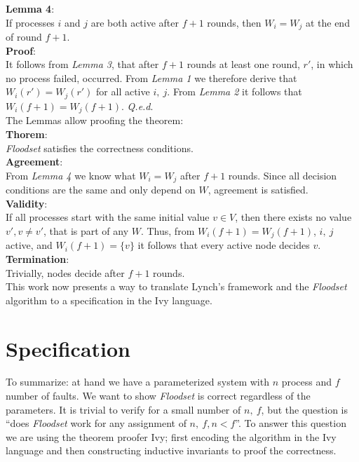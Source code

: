 \documentclass[fleqn]{article}
\begin{document}
\noindent \textbf{Lemma 4}:\\
If processes $i$ and $j$ are both active after $f+1$ rounds, then $W_i = W_j$ at the end of round $f + 1$.\\
\textbf{Proof}:\\
It follows from \textit{Lemma 3}, that after $f+1$ rounds at least one round, $r'$, in which no process failed, occurred. From \textit{Lemma 1} we therefore derive that $W_i(r') = W_j(r')$ for all active $i,\ j$.
From \textit{Lemma 2} it follows that $W_i(f+1) = W_j(f+1)$. \textit{Q.e.d}.\\

\noindent The Lemmas allow proofing the theorem:\\
\noindent \textbf{Thorem}:\\
\textit{Floodset} satisfies the correctness conditions.\\
\textbf{Agreement}:\\
From \textit{Lemma 4} we know what $W_i = W_j$ after $f+1$ rounds. Since all decision conditions are the same and only depend on $W$, agreement is satisfied.\\
\textbf{Validity}:\\
If all processes start with the same initial value $v \in V$, then there exists no value $v', v \neq v'$, that is part of any $W$. Thus, from $W_i(f+1) = W_j(f+1)$, $i,\ j$ active, and $W_i(f+1) = \{v\}$ it follows
that every active node decides $v$.\\
\textbf{Termination}:\\
Trivially, nodes decide after $f+1$ rounds.\\

This work now presents a way to translate Lynch's framework and the \textit{Floodset} algorithm to a specification in the Ivy language.

\section{Specification}
To summarize: at hand we have a parameterized system with $n$ process and $f$ number of faults. We want to show \textit{Floodset} is correct regardless of the parameters. It is trivial to verify for a small number of $n,\ f$, but the question is ``does \textit{Floodset} work for any assignment of $n,\ f, n \lt f$''.
To answer this question we are using the theorem proofer Ivy; first encoding the algorithm in the Ivy language and then constructing inductive invariants to proof the correctness.
\end{document}

